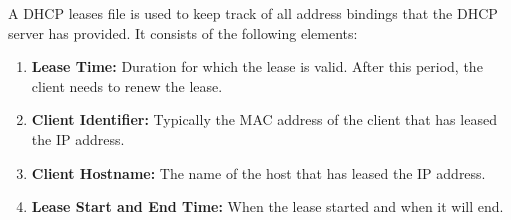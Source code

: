 A DHCP leases file is used to keep track of all address bindings that the DHCP server has provided. It consists of the following elements:

\begin{enumerate}
    \item \textbf{Lease Time:} Duration for which the lease is valid. After this period, the client needs to renew the lease.
    \item \textbf{Client Identifier:} Typically the MAC address of the client that has leased the IP address.
    \item \textbf{Client Hostname:} The name of the host that has leased the IP address.
    \item \textbf{Lease Start and End Time:} When the lease started and when it will end.
\end{enumerate}